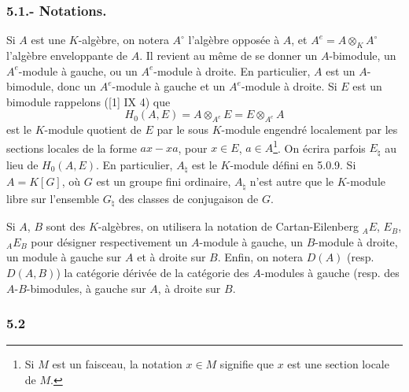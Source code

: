\documentclass[11pt]{article}
\begin{document}
\subsubsection*{5.1.- Notations.}

Si $A$ est une $K$-algèbre, on notera $A^\circ$ l'algèbre opposée à $A$, et $A^e=A\otimes_KA^\circ$ l'algèbre enveloppante de $A$. Il revient au même de se donner un $A$-bimodule, un $A^e$-module à gauche, ou un $A^e$-module à droite. En particulier, $A$ est un $A$-bimodule, donc un $A^e$-module à gauche et un $A^e$-module à droite. Si $E$ est un bimodule rappelons ([1] IX 4) que
\[
H_0(A,E)=A\otimes_{A^e}E=E\otimes_{A^e}A
\]
est le $K$-module quotient de $E$ par le sous $K$-module engendré localement par les sections locales de la forme $ax-xa$, pour $x\in E$, $a\in A$\footnote{Si $M$ est un faisceau, la notation $x\in M$ signifie que $x$ est une section locale de $M$.}. On écrira parfois $E_\natural$ au lieu de $H_0(A,E)$. En particulier, $A_\natural$ est le $K$-module défini en 5.0.9. Si $A=K[G]$, où $G$ est un groupe fini ordinaire, $A_\natural$ n'est autre que le $K$-module libre sur l'ensemble $G_\natural$ des classes de conjugaison de $G$.

Si $A$, $B$ sont des $K$-algèbres, on utilisera la notation de Cartan-Eilenberg ${}_AE$, $E_B$, ${}_AE_B$ pour désigner respectivement un $A$-module à gauche, un $B$-module à droite, un module à gauche sur $A$ et à droite sur $B$. Enfin, on notera $D(A)$ (resp. $D(A,B)$) la catégorie dérivée de la catégorie des $A$-modules à gauche (resp. des $A$-$B$-bimodules, à gauche sur $A$, à droite sur $B$.

\subsubsection*{5.2}
\end{document}

